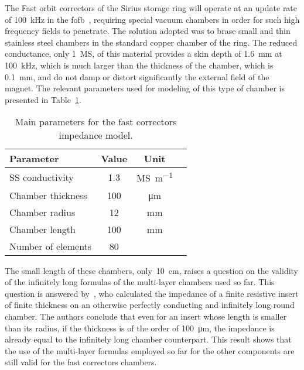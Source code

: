     The Fast orbit correctors of the Sirius storage ring will operate at an update rate of \SI{100}{\kilo\hertz} in the \gls{fofb}~\cite{Tavares2013}, requiring special vacuum chambers in order for such high frequency fields to penetrate. The solution adopted was to brase small and thin stainless steel chambers in the standard copper chamber of the ring. The reduced conductance, only \SI{1}{\mega\siemens}, of this material provides a skin depth of \SI{1.6}{\milli\meter} at \SI{100}{\kilo\hertz}, which is much larger than the thickness of the chamber, which is \SI{0.1}{\milli\meter}, and do not damp or distort significantly the external field of the magnet. The relevant parameters used for modeling of this type of chamber is presented in Table~\ref{tab:fast_correctors_chamber_parameters}.
    \begin{table}[hb]
        \centering
        \caption{Main parameters for the fast correctors impedance model.}
        \label{tab:fast_correctors_chamber_parameters}
        \begin{tabular}{lccc}
            \toprule
            Parameter            & Value      & Unit \\
            \midrule
            SS conductivity      & 1.3  & \si{\mega\siemens\per\meter}\\
            Chamber thickness    & 100  & \si{\micro\meter}\\
            Chamber radius       & 12   & \si{\milli\meter}\\
            Chamber length       & 100  & \si{\milli\meter}\\
            Number of elements   &  80  & \\
            \bottomrule
        \end{tabular}
    \end{table}

    The small length of these chambers, only~\SI{10}{\centi\meter}, raises a question on the validity of the infinitely long formulas of the multi-layer chambers used so far. This question is answered by~, who calculated the impedance of a finite resistive insert of finite thickness on an otherwise perfectly conducting and infinitely long round chamber. The authors conclude that even for an insert whose length is smaller than its radius, if the thickness is of the order of \SI{100}{\micro\meter}, the impedance is already equal to the infinitely long chamber counterpart. This result shows that the use of the multi-layer formulas employed so far for the other components are still valid for the fast correctors chambers.

